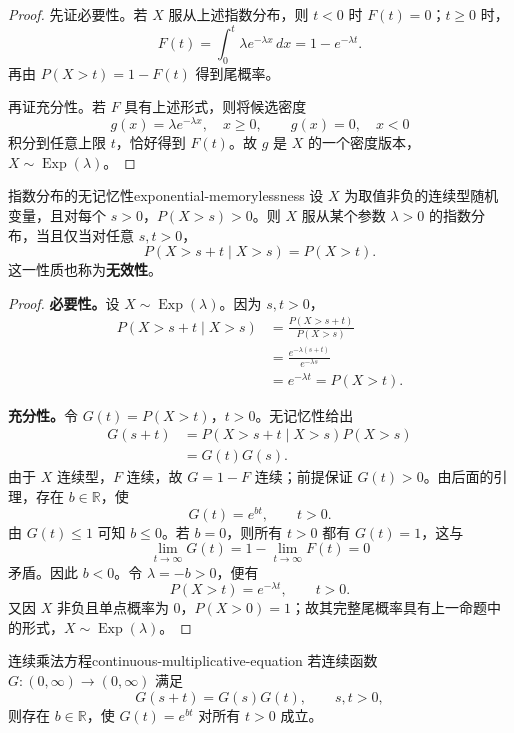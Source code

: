 \begin{proof}
先证必要性。若 $X$ 服从上述指数分布，则 $t<0$ 时 $F(t)=0$；$t\geq0$ 时，
\[
F(t)=\int_0^t\lambda e^{-\lambda x}\,dx
=1-e^{-\lambda t}.
\]
再由 $P(X>t)=1-F(t)$ 得到尾概率。

再证充分性。若 $F$ 具有上述形式，则将候选密度
\[
g(x)=\lambda e^{-\lambda x},\quad x\geq0,
\qquad g(x)=0,\quad x<0
\]
积分到任意上限 $t$，恰好得到 $F(t)$。故 $g$ 是 $X$ 的一个密度版本，$X\sim\operatorname{Exp}(\lambda)$。
\end{proof}

\begin{mytheorem}{指数分布的无记忆性}{exponential-memorylessness}
设 $X$ 为取值非负的连续型随机变量，且对每个 $s>0$，$P(X>s)>0$。则 $X$ 服从某个参数 $\lambda>0$ 的指数分布，当且仅当对任意 $s,t>0$，
\[
P(X>s+t\mid X>s)=P(X>t).
\]
这一性质也称为\textbf{无效性}。
\end{mytheorem}

\begin{proof}
\textbf{必要性。}\quad 设 $X\sim\operatorname{Exp}(\lambda)$。因为 $s,t>0$，
\[
\begin{aligned}
P(X>s+t\mid X>s)
&=\frac{P(X>s+t)}{P(X>s)}\\
&=\frac{e^{-\lambda(s+t)}}{e^{-\lambda s}}\\
&=e^{-\lambda t}=P(X>t).
\end{aligned}
\]

\textbf{充分性。}\quad 令 $G(t)=P(X>t)$，$t>0$。无记忆性给出
\[
\begin{aligned}
G(s+t)
&=P(X>s+t\mid X>s)P(X>s)\\
&=G(t)G(s).
\end{aligned}
\]
由于 $X$ 连续型，$F$ 连续，故 $G=1-F$ 连续；前提保证 $G(t)>0$。由后面的引理，存在 $b\in\mathbb R$，使
\[
G(t)=e^{bt},\qquad t>0.
\]
由 $G(t)\leq1$ 可知 $b\leq0$。若 $b=0$，则所有 $t>0$ 都有 $G(t)=1$，这与
\[
\lim_{t\to\infty}G(t)
=1-\lim_{t\to\infty}F(t)=0
\]
矛盾。因此 $b<0$。令 $\lambda=-b>0$，便有
\[
P(X>t)=e^{-\lambda t},\qquad t>0.
\]
又因 $X$ 非负且单点概率为 $0$，$P(X>0)=1$；故其完整尾概率具有上一命题中的形式，$X\sim\operatorname{Exp}(\lambda)$。
\end{proof}

\begin{mylemma}{连续乘法方程}{continuous-multiplicative-equation}
若连续函数 $G:(0,\infty)\to(0,\infty)$ 满足
\[
G(s+t)=G(s)G(t),\qquad s,t>0,
\]
则存在 $b\in\mathbb R$，使 $G(t)=e^{bt}$ 对所有 $t>0$ 成立。
\end{mylemma}

